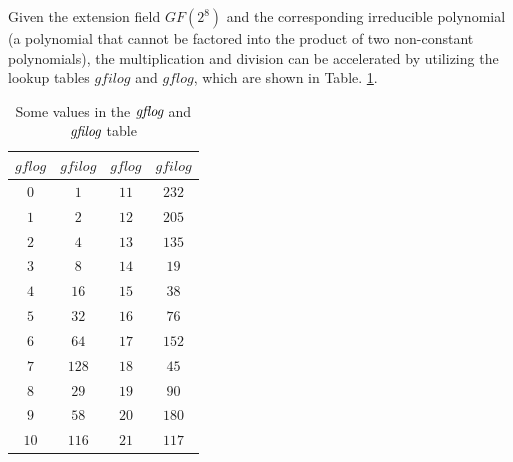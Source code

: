 \documentclass[journal]{IEEEtran}
\begin{document}
Given the extension field $GF(2^8)$ and the corresponding irreducible polynomial (a polynomial that cannot be factored into the product of two non-constant polynomials), the multiplication and division can be accelerated by utilizing the lookup tables $gfilog$ and $gflog$, which are shown in Table. \ref{table:GFlog_GFilog}.

\begin{table}[htbp]
\caption{Some values in the $\emph{gflog}$ and $\emph{gfilog}$ table} \label{table:GFlog_GFilog}
\begin{center}
\begin{tabular}{c c | c c}
\toprule[1pt]
 $gflog$                       & $gfilog$                          & $gflog$                 & $gfilog$ \\ \hline
 $0$                           & $1$                               & $11$                    & $232$      \\
 $1$                           & $2$                               & $12$                    & $205$      \\
 $2$                           & $4$                               & $13$                    & $135$     \\
 $3$                           & $8$                               & $14$                    & $19$     \\
 $4$                           & $16$                              & $15$                    & $38$      \\
 $5$                           & $32$                              & $16$                    & $76$      \\
 $6$                           & $64$                              & $17$                    & $152$      \\
 $7$                           & $128$                             & $18$                    & $45$      \\
 $8$                           & $29$                              & $19$                    & $90$      \\
 $9$                           & $58$                              & $20$                    & $180$      \\
 $10$                          & $116$                             & $21$                    & $117$      \\
\bottomrule[1pt]
\end{tabular}
\end{center}
\end{table}
\end{document}
